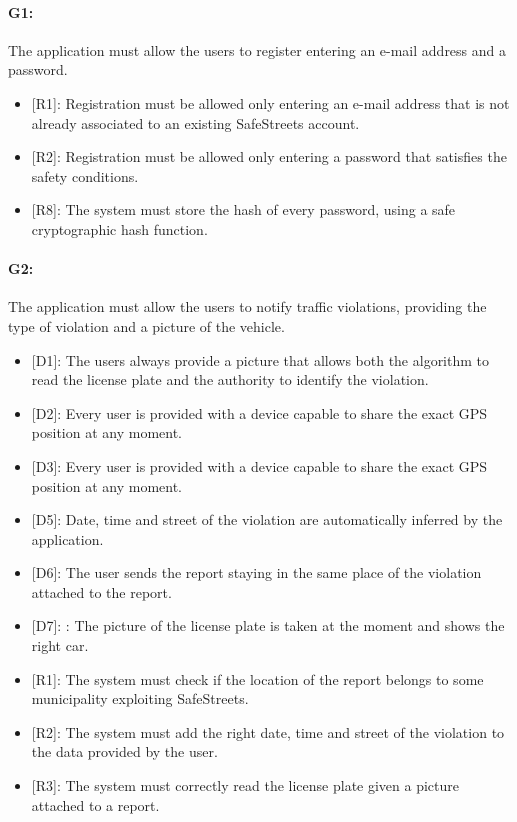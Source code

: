 \documentclass[12pt,a4paper]{report}
\begin{document}
			
			
			\paragraph {G1:} The application must allow the users to register entering an e-mail address and a password.
			\begin{itemize}
				\item{[R1]:} Registration must be allowed only entering an e-mail address that is not already associated to an existing SafeStreets account.
				\item{[R2]:} Registration must be allowed only entering a password that satisfies the safety conditions.
				\item{[R8]:} The system must store the hash of every password, using a safe cryptographic hash function.
			\end{itemize}

			\paragraph {G2:} The application must allow the users to notify traffic violations, providing the type of violation and a picture of the vehicle.
			\begin{itemize}
				\item{[D1]:} The users always provide a picture that allows both the algorithm to read the license plate and the authority to identify the violation.
				\item{[D2]:} Every user is provided with a device capable to share the exact GPS position at any moment.
				\item{[D3]:} Every user is provided with a device capable to share the exact GPS position at any moment.
				\item{[D5]:} Date, time and street of the violation are automatically inferred by the application.
				\item{[D6]:} The user sends the report staying in the same place of the violation attached to the report.
		 		\item{[D7]:} : The picture of the license plate is taken at the moment and shows the right car.
			\end{itemize}
			\begin{itemize}
				\item{[R1]:} The system must check if the location of the report belongs to some municipality exploiting SafeStreets.
				\item{[R2]:} The system must add the right date, time and street of the violation to the data provided by the user.
				\item{[R3]:} The system must correctly read the license plate given a picture attached to a report.
			\end{itemize}
\end{document}
